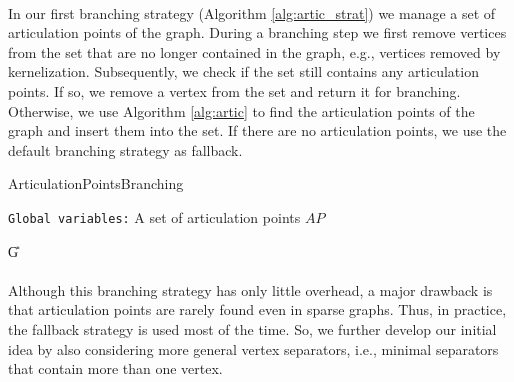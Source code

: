 \documentclass[12pt,a4paper,twoside]{scrartcl}
\numberwithin{equation}{section}
\let\oldnl\nl%
\newcommand{\nonl}{\renewcommand{\nl}{\let\nl\oldnl}}%
\begin{document}
\paragraph{}
In our first branching strategy (Algorithm \ref{alg:artic_strat}) we manage a set of articulation points of the graph. During a branching step we first remove vertices from the set that are no longer contained in the graph, e.g., vertices removed by kernelization. Subsequently, we check if the set still contains any articulation points. If so, we remove a vertex from the set and return it for branching. Otherwise, we use Algorithm \ref{alg:artic} to find the articulation points of the graph and insert them into the set. If there are no articulation points, we use the default branching strategy as fallback. 

\begin{algorithm}
	\caption{ArticulationPointsBranching}\label{alg:artic_strat}
	\DontPrintSemicolon
	\nonl\texttt{Global variables:} A set of articulation points $AP$\\
	
	\U{G}
	
	
\end{algorithm}



\paragraph{}
Although this branching strategy has only little overhead, a major drawback  is that articulation points are rarely found even in sparse graphs. Thus, in practice, the fallback strategy is used most of the time. So, we further develop our initial idea by also considering more general vertex separators, i.e., minimal separators that contain more than one vertex. 
\end{document}
